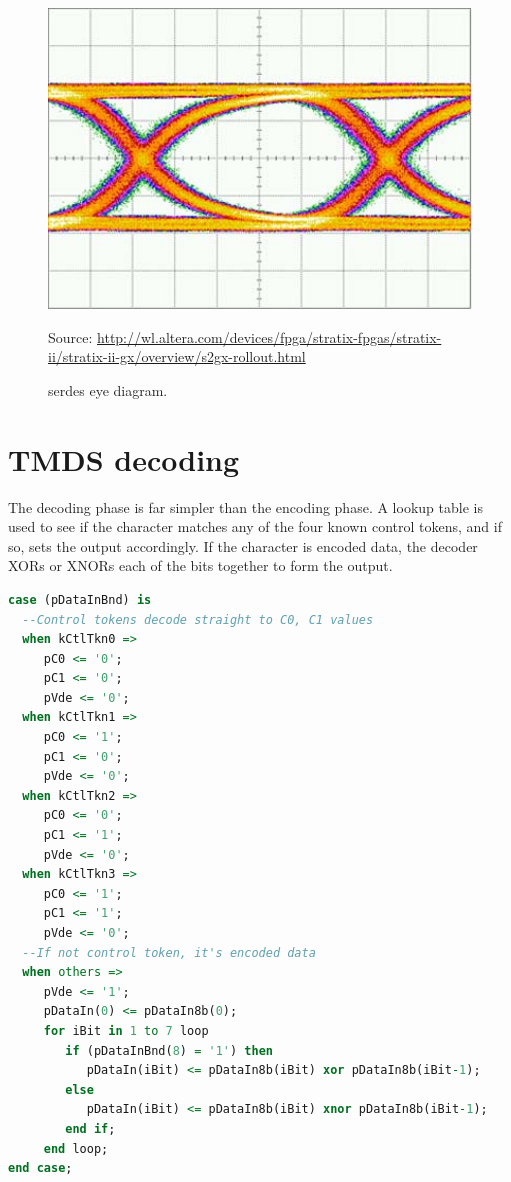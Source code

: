\begin{figure}
  \centering
  \includegraphics[width=1\textwidth]{./img/eye_diagram.jpg}\par
  Source: \url{http://wl.altera.com/devices/fpga/stratix-fpgas/stratix-ii/stratix-ii-gx/overview/s2gx-rollout.html}
  \caption{\gls{serdes} eye diagram.}
  \label{fig:eye_diagram}
\end{figure}

\section{TMDS decoding}

The decoding phase is far simpler than the encoding phase. A lookup table is used to see if the character matches any of the four known control tokens, and if so, sets the output accordingly. If the character is encoded data, the decoder XORs or XNORs each of the bits together to form the output.

\begin{lstlisting}[caption={TMDS decoding logic.}, label={lst:tmds_decode}, language=VHDL]
case (pDataInBnd) is
  --Control tokens decode straight to C0, C1 values
  when kCtlTkn0 =>
     pC0 <= '0';
     pC1 <= '0';
     pVde <= '0';
  when kCtlTkn1 =>
     pC0 <= '1';
     pC1 <= '0';
     pVde <= '0';               
  when kCtlTkn2 =>
     pC0 <= '0';
     pC1 <= '1';
     pVde <= '0';
  when kCtlTkn3 =>
     pC0 <= '1';
     pC1 <= '1';
     pVde <= '0';
  --If not control token, it's encoded data
  when others =>
     pVde <= '1'; 
     pDataIn(0) <= pDataIn8b(0);
     for iBit in 1 to 7 loop
        if (pDataInBnd(8) = '1') then
           pDataIn(iBit) <= pDataIn8b(iBit) xor pDataIn8b(iBit-1);
        else
           pDataIn(iBit) <= pDataIn8b(iBit) xnor pDataIn8b(iBit-1);
        end if;
     end loop;                           
end case;
\end{lstlisting}
